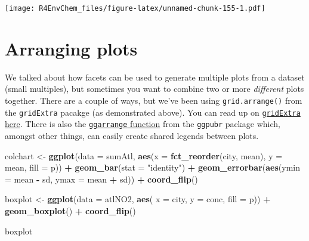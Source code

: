 \documentclass[
]{book}
\newenvironment{Shaded}{\begin{snugshade}}{\end{snugshade}}
\newcommand{\AttributeTok}[1]{\textcolor[rgb]{0.13,0.29,0.53}{#1}}
\newcommand{\FunctionTok}[1]{\textcolor[rgb]{0.13,0.29,0.53}{\textbf{#1}}}
\newcommand{\NormalTok}[1]{#1}
\newcommand{\OtherTok}[1]{\textcolor[rgb]{0.56,0.35,0.01}{#1}}
\newcommand{\SpecialCharTok}[1]{\textcolor[rgb]{0.81,0.36,0.00}{\textbf{#1}}}
\newcommand{\StringTok}[1]{\textcolor[rgb]{0.31,0.60,0.02}{#1}}
\begin{document}
\texttt{[image: R4EnvChem\_files/figure-latex/unnamed-chunk-155-1.pdf]}

\hypertarget{arranging-plots}{%
\section{Arranging plots}\label{arranging-plots}}

We talked about how facets can be used to generate multiple plots from a dataset (small multiples), but sometimes you want to combine two or more \emph{different} plots together. There are a couple of ways, but we've been using \texttt{grid.arrange()} from the \texttt{gridExtra} pacakge (as demonstrated above). You can read up on \href{https://cran.r-project.org/web/packages/egg/vignettes/Ecosystem.html}{\texttt{gridExtra} here}. There is also the \href{https://rpkgs.datanovia.com/ggpubr/reference/ggarrange.html}{\texttt{ggarrange} function} from the \texttt{ggpubr} package which, amongst other things, can easily create shared legends between plots.

\begin{Shaded}
\begin{Highlighting}[]
\NormalTok{colchart }\OtherTok{\textless{}{-}} \FunctionTok{ggplot}\NormalTok{(}\AttributeTok{data =}\NormalTok{ sumAtl,}
                   \FunctionTok{aes}\NormalTok{(}\AttributeTok{x =} \FunctionTok{fct\_reorder}\NormalTok{(city, mean),}
                       \AttributeTok{y =}\NormalTok{ mean, }
                       \AttributeTok{fill =}\NormalTok{ p)) }\SpecialCharTok{+}
  \FunctionTok{geom\_bar}\NormalTok{(}\AttributeTok{stat =} \StringTok{"identity"}\NormalTok{) }\SpecialCharTok{+}
  \FunctionTok{geom\_errorbar}\NormalTok{(}\FunctionTok{aes}\NormalTok{(}\AttributeTok{ymin =}\NormalTok{ mean }\SpecialCharTok{{-}}\NormalTok{ sd, }
                    \AttributeTok{ymax =}\NormalTok{ mean }\SpecialCharTok{+}\NormalTok{ sd)) }\SpecialCharTok{+}
  \FunctionTok{coord\_flip}\NormalTok{() }

\NormalTok{boxplot }\OtherTok{\textless{}{-}} \FunctionTok{ggplot}\NormalTok{(}\AttributeTok{data =}\NormalTok{ atlNO2, }
                  \FunctionTok{aes}\NormalTok{( }\AttributeTok{x =}\NormalTok{ city, }
                       \AttributeTok{y =}\NormalTok{ conc,}
                       \AttributeTok{fill =}\NormalTok{ p)) }\SpecialCharTok{+}
  \FunctionTok{geom\_boxplot}\NormalTok{() }\SpecialCharTok{+} 
  \FunctionTok{coord\_flip}\NormalTok{()}

\NormalTok{boxplot}
\end{Highlighting}
\end{Shaded}
\end{document}
